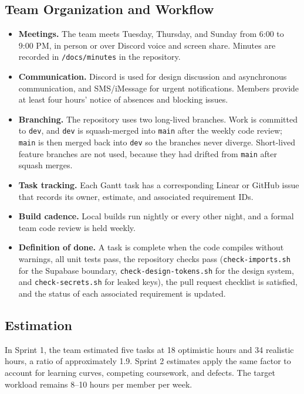 \documentclass[12pt,letterpaper]{article}
\begin{document}
\subsection{Team Organization and Workflow}
\begin{itemize}
  \item \textbf{Meetings.} The team meets Tuesday, Thursday, and Sunday from 6:00 to
        9:00 PM, in person or over Discord voice and screen share. Minutes are
        recorded in \texttt{/docs/minutes} in the repository.
  \item \textbf{Communication.} Discord is used for design discussion and asynchronous
        communication, and SMS/iMessage for urgent notifications. Members provide at
        least four hours' notice of absences and blocking issues.
  \item \textbf{Branching.} The repository uses two long-lived branches. Work is
        committed to \texttt{dev}, and \texttt{dev} is squash-merged into \texttt{main}
        after the weekly code review; \texttt{main} is then merged back into
        \texttt{dev} so the branches never diverge. Short-lived feature branches are
        not used, because they had drifted from \texttt{main} after squash merges.
  \item \textbf{Task tracking.} Each Gantt task has a corresponding Linear or GitHub
        issue that records its owner, estimate, and associated requirement IDs.
  \item \textbf{Build cadence.} Local builds run nightly or every other night, and a
        formal team code review is held weekly.
  \item \textbf{Definition of done.} A task is complete when the code compiles without
        warnings, all unit tests pass, the repository checks pass
        (\texttt{check-imports.sh} for the Supabase boundary,
        \texttt{check-design-tokens.sh} for the design system, and
        \texttt{check-secrets.sh} for leaked keys), the pull request checklist is
        satisfied, and the status of each associated requirement is updated.
\end{itemize}

\subsection{Estimation}
In Sprint 1, the team estimated five tasks at 18 optimistic hours and 34 realistic
hours, a ratio of approximately 1.9. Sprint 2 estimates apply the same factor to
account for learning curves, competing coursework, and defects. The target workload
remains 8--10 hours per member per week.
\end{document}

